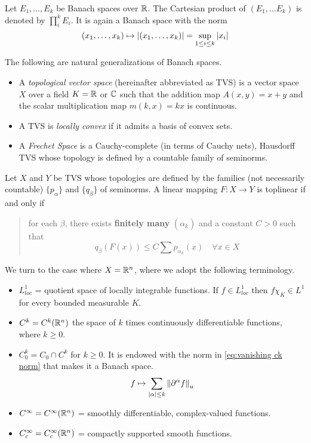 \documentclass[../main-v2-manifolds.tex]{subfiles}
\begin{document}
\begin{definition}\label{def:finite-product-banach-space}
    Let $E_1,\ldots, E_k$ be Banach spaces over $\mathbb{R}$. The Cartesian product of $(E_1,\ldots E_k)$ is denoted by $\prod_i^k E_i$. It is again a Banach space with the norm
    \begin{equation}\label{eq:finite-product-banach-space-norm}
        (x_1,\ldots, x_k)\mapsto \vert {(x_1,\ldots, x_k)} \vert = \sup_{1 \leq i\leq k}\vert {x_i} \vert
    \end{equation}
\end{definition}

The following are natural generalizations of Banach spaces.
\begin{itemize}
    \item A \emph{topological vector space} (hereinafter abbreviated as TVS) is a vector space $X$ over a field $K = \mathbb{R}$ or ${\mathbb{C}}$ such that the addition map $A(x,y) = x+y$ and the scalar multiplication map $m(k,x) = kx$ is continuous.
    \item A TVS is \emph{locally convex} if it admits a basis of convex sets.
    \item A \emph{Frechet Space} is a Cauchy-complete (in terms of Cauchy nets), Hausdorff TVS whose topology is defined by a countable family of seminorms.
\end{itemize}
Let $X$ and $Y$ be TVS whose topologies are defined by the families (not necessarily countable) $\{p_{\alpha}\}$ and $\{q_\beta\}$ of seminorms. A linear mapping $F:X\to Y$ is toplinear if and only if 
\begin{quote}
    for each $\beta$, there exists \textbf{finitely many} $(\alpha_{\underline{k}})$ and a constant $C>0$ such that 
    \[
        q_\beta(F(x))\leq C\sum p_{\alpha_{\underline{k}}}(x)\quad\forall x\in X
    \]
\end{quote}





We turn to the case where $X={\mathbb{R}^n}$, where we adopt the following terminology. 
\begin{itemize}
    \item $L^1_{loc}$ = quotient space of locally integrable functions. If $f\in L^1_{loc}$ then $f\chi_K\in L^1$ for every bounded measurable $K$.
    \item $C^k = C^k({\mathbb{R}^n})$ the space of $k$ times continuously differentiable functions, where $k\geq 0$.
    \item $C_0^k = C_0\cap C^k$ for $k\geq 0$. It is endowed with the norm in \cref{eq:vanishing ck norm} that makes it a Banach space.
    \begin{equation}
        f\mapsto \sum_{\vert {\alpha} \vert\leq k}\norm{\partial^\alpha f}_u
        \label{eq:vanishing ck norm}
    \end{equation}
    \item $C^\infty=C^\infty({\mathbb{R}^n})$ = smoothly differentiable, complex-valued functions.
    \item $C^\infty_c=C^\infty_c({\mathbb{R}^n})$ = compactly supported smooth functions.
\end{itemize}
\end{document}
